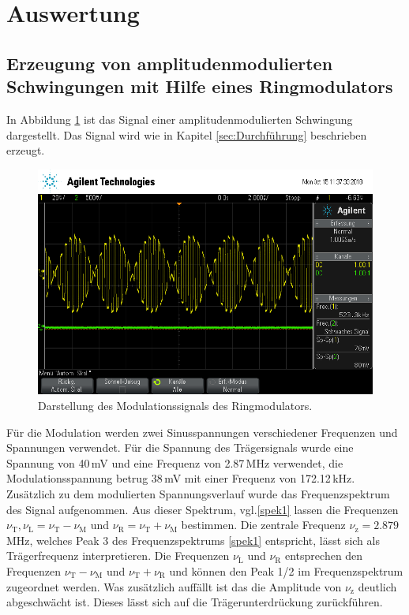 \section{Auswertung}
\label{sec:Auswertung}

\subsection{Erzeugung von amplitudenmodulierten Schwingungen mit Hilfe eines
Ringmodulators}
In Abbildung \ref{fig:plot} ist das Signal einer amplitudenmodulierten
Schwingung dargestellt. Das Signal wird wie in Kapitel \ref{sec:Durchführung}
beschrieben erzeugt.

\begin{figure}
  \centering
  \includegraphics[width=0.7\linewidth]{ressources/scope_451.png}
  \caption{Darstellung des Modulationssignals des Ringmodulators.}
  \label{fig:plot}
\end{figure}
Für die Modulation werden zwei Sinusspannungen verschiedener Frequenzen und
Spannungen verwendet.
Für die Spannung des Trägersignals wurde eine Spannung von 40$\,$mV und eine
Frequenz von 2.87$\,$MHz
verwendet, die Modulationsspannung betrug 38$\,$mV mit einer Frequenz von
172.12$\,$kHz. Zusätzlich zu
dem modulierten Spannungsverlauf wurde das Frequenzspektrum des
Signal aufgenommen. Aus dieser Spektrum, vgl.\ref{spek1} lassen
die Frequenzen $\nu_\text{T},\nu_\text{L}=\nu_\text{T}-\nu_\text{M}$ und
$\nu_\text{R}=\nu_\text{T}+\nu_\text{M}$ bestimmen.
Die zentrale Frequenz $\nu_\text{z}=2.879\,$MHz, welches Peak 3 des
Frequenzspektrums \ref{spek1} entspricht, lässt sich als Trägerfrequenz interpretieren.
Die Frequenzen $\nu_\text{L}$ und $\nu_\text{R}$ entsprechen den Frequenzen
$\nu_\text{T}-\nu_\text{M}$ und $\nu_\text{T}+\nu_\text{R}$ und können den
Peak 1/2 im Frequenzspektrum zugeordnet werden. Was zusätzlich auffällt ist das
die Amplitude von $\nu_\text{z}$ deutlich abgeschwächt ist. Dieses lässt sich
auf die Trägerunterdrückung zurückführen.

